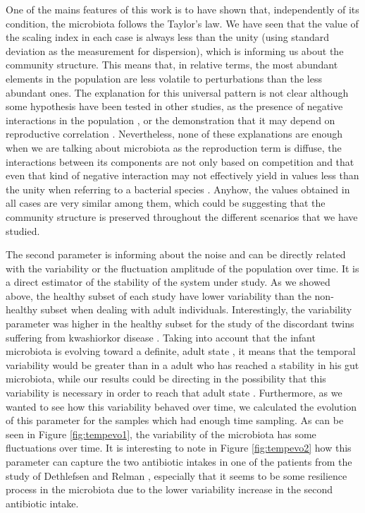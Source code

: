 One of the mains features of this work is to have shown that, independently of its condition, the microbiota follows the Taylor's law. We have seen that the value of the scaling index in each case is always less than the unity (using standard deviation as the measurement for dispersion), which is informing us about the community structure. This means that, in relative terms, the most abundant elements in the population are less volatile to perturbations than the less abundant ones. The explanation for this universal pattern is not clear although some hypothesis have been tested in other studies, as the presence of negative interactions in the population \cite{kilpatrick}, or the demonstration that it may depend on reproductive correlation \cite{ballantyne}. Nevertheless, none of these explanations are enough when we are talking about microbiota as the reproduction term is diffuse, the interactions between its components are not only based on competition \cite{joao, mehta, bucci} and that even that kind of negative interaction may not effectively yield in values less than the unity when referring to a bacterial species \cite{ramslayer}. Anyhow, the values obtained in all cases are very similar among them, which could be suggesting that the community structure is preserved throughout the different scenarios that we have studied.

The second parameter is informing about the noise and can be directly related with the variability or the fluctuation amplitude of the population over time. It is a direct estimator of the stability of the system under study. As we showed above, the healthy subset of each study have lower variability than the non-healthy subset when dealing with adult individuals. Interestingly, the variability parameter was higher in the healthy subset for the study of the discordant twins suffering from kwashiorkor disease \cite{kwashiorkor}. Taking into account that the infant microbiota is evolving toward a definite, adult state \cite{koenig}, it means that the temporal variability would be greater than in a adult who has reached a stability in his gut microbiota, while our results could be directing in the possibility that this variability is necessary in order to reach that adult state  . Furthermore, as we wanted to see how this variability behaved over time, we calculated the evolution of this parameter for the samples which had enough time sampling. As can be seen in Figure \ref{fig:tempevo1}, the variability of the microbiota has some fluctuations over time. It is interesting to note in Figure \ref{fig:tempevo2} how this parameter can capture the two antibiotic intakes in one of the patients from the study of Dethlefsen and Relman \cite{antibiotic}, especially that it seems to be some resilience process in the microbiota due to the lower variability increase in the second antibiotic intake.  

